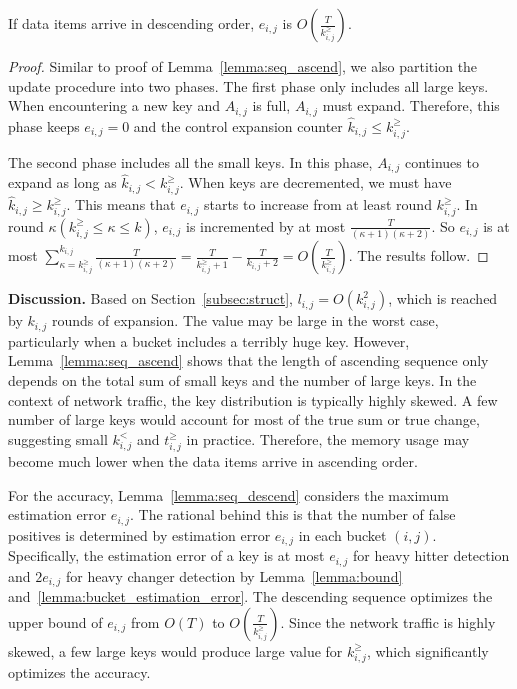 \begin{lemma}
\label{lemma:seq_descend}
If data items arrive in descending order, $e_{i,j}$ is $O(\frac{T}{k^{\ge}_{i,j}})$.
\end{lemma}
\begin{proof}
Similar to proof of Lemma~\ref{lemma:seq_ascend}, we also partition the update procedure into two phases.
The first phase only includes all large keys.
When encountering a new key and $A_{i,j}$ is full,
$A_{i,j}$ must expand.
Therefore, this phase keeps $e_{i,j}=0$ and the control expansion counter $\hat{k}_{i,j}\le k^{\ge}_{i,j}$.

The second phase includes all the small keys.
In this phase, $A_{i,j}$ continues to expand as long as $\hat{k}_{i,j}<k^{\ge}_{i,j}$.
When keys are decremented, we must have $\hat{k}_{i,j} \ge k^{\ge}_{i,j}$.
This means that $e_{i,j}$ starts to increase from at least round $k^{\ge}_{i,j}$.
In round $\kappa (k^{\ge}_{i,j}\le\kappa\le k)$, $e_{i,j}$ is incremented by at most $\frac{T}{(\kappa+1)(\kappa+2)}$.
So $e_{i,j}$ is at most $\sum_{\kappa=k^{\ge}_{i,j}}^{k_{i,j}}\frac{T}{(\kappa+1)(\kappa+2)}=\frac{T}{k^{\ge}_{i,j}+1}-\frac{T}{k_{i,j}+2}=O(\frac{T}{k^{\ge}_{i,j}})$.
The results follow.
\end{proof}

{\bf Discussion.}
Based on Section~\ref{subsec:struct}, $l_{i,j} = O(k_{i,j}^2)$, which is reached by $k_{i,j}$ rounds of expansion.
The value may be large in the worst case, particularly when a bucket includes a terribly huge key.
However, Lemma~\ref{lemma:seq_ascend} shows that the length of ascending sequence
only depends on the total sum of small keys and the number of large keys.
In the context of network traffic, the key distribution is typically highly skewed.
A few number of large keys would account for most of the true sum or true change,
suggesting small $k^{<}_{i,j}$ and $t^{\ge}_{i,j}$ in practice.
Therefore, the memory usage may become much lower when the data items arrive in ascending order.

For the accuracy, Lemma~\ref{lemma:seq_descend} considers the maximum estimation error $e_{i, j}$.
The rational behind this is that the number of false positives is determined by estimation error $e_{i,j}$ in each bucket $(i,j)$.
Specifically, the estimation error of a key is at most $e_{i, j}$ for heavy hitter detection and $2e_{i, j}$ for heavy changer detection by Lemma~\ref{lemma:bound} and~\ref{lemma:bucket_estimation_error}.
The descending sequence optimizes the upper bound of $e_{i,j}$ from $O(T)$ to $O(\frac{T}{k^{\ge}_{i,j}})$.
Since the network traffic is highly skewed, a few large keys would produce large value for $k^{\ge}_{i,j}$,
which significantly optimizes the accuracy.

